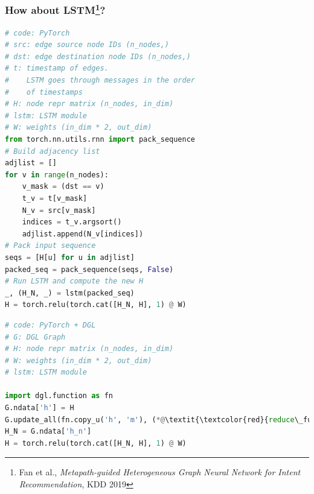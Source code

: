 \documentclass[10pt,aspectratio=169]{beamer}
\begin{document}
	\begin{frame}[fragile]
		\frametitle{How about LSTM\footnote{Fan et al., \emph{Metapath-guided Heterogeneous Graph Neural Network for Intent Recommendation}, KDD 2019}?}
		\begin{minipage}{0.5\textwidth}
\begin{lstlisting}[language=Python]
# code: PyTorch
# src: edge source node IDs (n_nodes,)
# dst: edge destination node IDs (n_nodes,)
# t: timestamp of edges.
#    LSTM goes through messages in the order
#    of timestamps
# H: node repr matrix (n_nodes, in_dim)
# lstm: LSTM module
# W: weights (in_dim * 2, out_dim)
from torch.nn.utils.rnn import pack_sequence
# Build adjacency list
adjlist = []
for v in range(n_nodes): 
    v_mask = (dst == v) 
    t_v = t[v_mask] 
    N_v = src[v_mask] 
    indices = t_v.argsort() 
    adjlist.append(N_v[indices])
# Pack input sequence
seqs = [H[u] for u in adjlist]
packed_seq = pack_sequence(seqs, False)
# Run LSTM and compute the new H
_, (H_N, _) = lstm(packed_seq)
H = torch.relu(torch.cat([H_N, H], 1) @ W)
\end{lstlisting}
		\end{minipage}%
		\begin{minipage}{0.5\textwidth}
\begin{lstlisting}[language=Python]
# code: PyTorch + DGL
# G: DGL Graph
# H: node repr matrix (n_nodes, in_dim)
# W: weights (in_dim * 2, out_dim)
# lstm: LSTM module

import dgl.function as fn
G.ndata['h'] = H
G.update_all(fn.copy_u('h', 'm'), (*@\textit{\textcolor{red}{reduce\_func}}@*))
H_N = G.ndata['h_n']
H = torch.relu(torch.cat([H_N, H], 1) @ W)
\end{lstlisting}
		\end{minipage}
	\end{frame}
\end{document}
